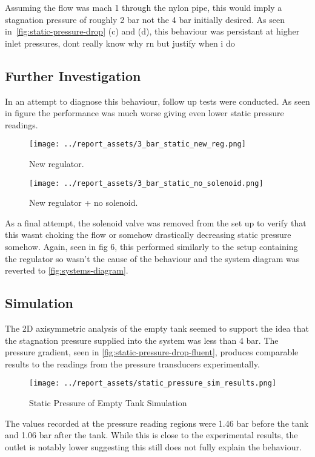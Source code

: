 Assuming the flow was mach 1 through the nylon pipe, this would imply a stagnation pressure of roughly 2 bar not the 4 bar initially desired. As seen in~\autoref{fig:static-pressure-drop} (c) and (d), this behaviour was persistant at higher inlet pressures, dont really know why rn but justify when i do

\subsection{Further Investigation}
In an attempt to diagnose this behaviour, follow up tests were conducted. As seen in figure the performance was much worse giving even lower static pressure readings. 
\begin{figure}[htbp]
    \centering

    \begin{minipage}{0.45\textwidth}
        \centering
        \texttt{[image: ../report\_assets/3\_bar\_static\_new\_reg.png]}
        \caption{New regulator.}\label{fig:static-pressure-drop-new-reg}
    \end{minipage}    
    \hfill
    \begin{minipage}{0.45\textwidth}
        \centering
        \texttt{[image: ../report\_assets/3\_bar\_static\_no\_solenoid.png]}
        \caption{New regulator + no solenoid.}\label{fig:static-pressure-drop-no-solenoid}
    \end{minipage}    

\end{figure}    
As a final attempt, the solenoid valve was removed from the set up to verify that this wasnt choking the flow or somehow drastically decreasing static pressure somehow. Again, seen in fig 6, this performed similarly to the setup containing the regulator so wasn't the cause of the behaviour and the system diagram was reverted to \autoref{fig:systems-diagram}.

\subsection{Simulation}
The 2D axisymmetric analysis of the empty tank seemed to support the idea that the stagnation pressure supplied into the system was less than 4 bar. The pressure gradient, seen in \autoref{fig:static-pressure-drop-fluent}, produces comparable results to the readings from the pressure transducers experimentally. 
\begin{figure}[htbp]
    \centering
    
    \begin{minipage}{0.9\textwidth}
        \centering
        \texttt{[image: ../report\_assets/static\_pressure\_sim\_results.png]}
        \caption{Static Pressure of Empty Tank Simulation}\label{fig:static-pressure-drop-fluent}
    \end{minipage}    
    
\end{figure}    
The values recorded at the pressure reading regions were 1.46 bar before the tank and 1.06 bar after the tank. While this is close to the experimental results, the outlet is notably lower suggesting this still does not fully explain the behaviour.

